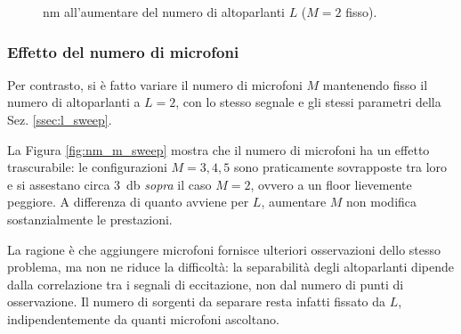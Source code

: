 \documentclass[11pt,a4paper]{article}
\begin{document}
	\begin{figure}[H]
		\centering
		\caption{\ac{nm} all'aumentare del numero di altoparlanti $L$ ($M = 2$ fisso).}
		\label{fig:nm_l_sweep}
	\end{figure}
	
	\subsubsection{Effetto del numero di microfoni}\label{ssec:m_sweep}
	Per contrasto, si è fatto variare il numero di microfoni $M$ mantenendo fisso il numero di altoparlanti a $L = 2$, con lo stesso segnale e gli stessi parametri della Sez. \ref{ssec:l_sweep}.
	
	La Figura \ref{fig:nm_m_sweep} mostra che il numero di microfoni ha un effetto trascurabile: le configurazioni $M = 3, 4, 5$ sono praticamente sovrapposte tra loro e si assestano circa \SI{3}{\decibel} \emph{sopra} il caso $M = 2$, ovvero a un floor lievemente peggiore. 
	A differenza di quanto avviene per $L$, aumentare $M$ non modifica sostanzialmente le prestazioni.
	
	La ragione è che aggiungere microfoni fornisce ulteriori osservazioni dello stesso problema, ma non ne riduce la difficoltà: la separabilità degli altoparlanti dipende dalla correlazione tra i segnali di eccitazione, non dal numero di punti di osservazione. 
	Il numero di sorgenti da separare resta infatti fissato da $L$, indipendentemente da quanti microfoni ascoltano.
	
\end{document}
